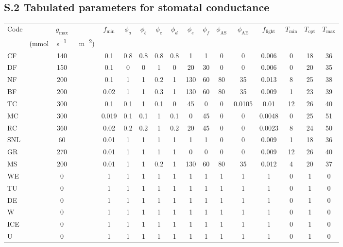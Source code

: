 \documentclass[manuscript]{copernicus}
\begin{document}
\subsection*{S.2 Tabulated parameters for stomatal conductance}
\appendixtables
\begin{sidewaystable}[!htbp]
  \begin{tabular}{lcccccccccccccc}
    \tophline
    Code & $g_\text{max}$ & $f_\text{min}$ & $\phi_a$ & $\phi_b$ & $\phi_c$ & $\phi_d$ & $\phi_e$ & $\phi_f$ & $\phi_\text{AS}$ & $\phi_\text{AE}$ & $f_\text{light}$ & $T_\text{min}$ & $T_\text{opt}$ & $T_\text{max}$ \\
    & (\unit{mmol\,s^{-1}\,\,m^{-2}}) &&&&&&&&&&&&&\\
    \middlehline
    CF & 140 & 0.1 & 0.8 & 0.8 & 0.8 & 0.8 & 1 & 1 & 0 & 0 & 0.006 & 0 & 18 & 36  \\
    DF & 150 & 0.1 & 0 & 0 & 1 & 0 & 20 & 30 & 0 & 0 & 0.006 & 0 & 20 & 35  \\
    NF & 200 & 0.1 & 1 & 1 & 0.2 & 1 & 130 & 60 & 80 & 35 & 0.013 & 8 & 25 & 38 \\
    BF & 200 & 0.02 & 1 & 1 & 0.3 & 1 & 130 & 60 & 80 & 35 & 0.009 & 1 & 23 & 39 \\
    TC & 300 & 0.1 & 0.1 & 1 & 0.1 & 0 & 45 & 0 & 0 & 0.0105 & 0.01 & 12 & 26 & 40 \\
    MC & 300 & 0.019 & 0.1 & 0.1 & 1 & 0.1 & 0 & 45 & 0 & 0 & 0.0048 & 0 & 25 & 51  \\
    RC & 360 & 0.02 & 0.2 & 0.2 & 1 & 0.2 & 20 & 45 & 0 & 0 & 0.0023 & 8 & 24 & 50  \\
    SNL & 60 & 0.01 & 1 & 1 & 1 & 1 & 1 & 1 & 0 & 0 & 0.009 & 1 & 18 & 36 \\
    GR & 270 & 0.01 & 1 & 1 & 1 & 1 & 0 & 0 & 0 & 0 & 0.009 & 12 & 26 & 40 \\
    MS & 200 & 0.01 & 1 & 1 & 0.2 & 1 & 130 & 60 & 80 & 35 & 0.012 & 4 & 20 & 37 \\
    WE & 0 & 1 & 1 & 1 & 1 & 1 & 1 & 1 & 1 & 1 & 1 & 0 & 1 & 0 \\
    TU & 0 & 1 & 1 & 1 & 1 & 1 & 1 & 1 & 1 & 1 & 1 & 0 & 1 & 0  \\
    DE & 0 & 1 & 1 & 1 & 1 & 1 & 1 & 1 & 1 & 1 & 1 & 0 & 1 & 0  \\
    W & 0 & 1 & 1 & 1 & 1 & 1 & 1 & 1 & 1 & 1 & 1 & 0 & 1 & 0 \\
    ICE & 0 & 1 & 1 & 1 & 1 & 1 & 1 & 1 & 1 & 1 & 1 & 0 & 1 & 0 \\
    U & 0 & 1 & 1 & 1 & 1 & 1 & 1 & 1 & 1 & 1 & 1 & 0 & 1 & 0 \\

\end{tabular}
\end{sidewaystable}
\end{document}
